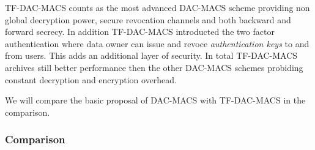 TF-DAC-MACS counts as the most advanced DAC-MACS scheme providing non global decryption power, secure revocation channels and both backward and forward secrecy. In addition TF-DAC-MACS introducted the two factor authentication where data owner can issue and revoce \textit{authentication keys} to and from users. This adds an additional layer of security. In total TF-DAC-MACS archives still better performance then the other DAC-MACS schemes probiding constant decryption and encryption overhead. 

We will compare the basic proposal of DAC-MACS with TF-DAC-MACS in the comparison. 

\subsubsection{Comparison}
\label{sec:ma-comparison}

